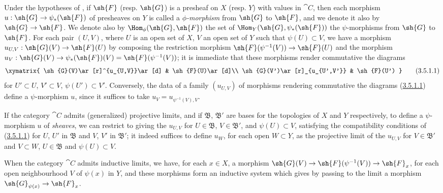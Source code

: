 \begin{env}[3.5.1]
\label{0.3.5.1}
Under the hypotheses of , if $\sh{F}$ (resp. $\sh{G}$) is a
presheaf on $X$ (resp. $Y$) with values in $\cat{C}$, then each morphism
$u:\sh{G}\to\psi_*(\sh{F})$ of presheaves on $Y$ is called a
\emph{$\phi$-morphism} from $\sh{G}$ to $\sh{F}$, and we denote it also by
$\sh{G}\to\sh{F}$. We denote also by $\Hom_\phi(\sh{G},\sh{F})$ the set of
$\Hom_Y(\sh{G},\psi_*(\sh{F}))$ the $\psi$-morphisms from $\sh{G}$ to $\sh{F}$.
For each pair $(U,V)$, where $U$ is an open set of $X$, $V$ an open set of $Y$
such that $\psi(U)\subset V$, we have a morphism $u_{U,V}:\sh{G}(V)\to\sh{F}(U)$
by composing the restriction morphism $\sh{F}(\psi^{-1}(V))\to\sh{F}(U)$ and the
morphism $u_V:\sh{G}(V)\to\psi_*(\sh{F})(V)=\sh{F}(\psi^{-1}(V))$; it is
immediate that these morphisms render commutative the diagrams
\[
\label{0.3.5.1.1}
  \xymatrix{
    \sh{G}(V)\ar[r]^{u_{U,V}}\ar[d] &
    \sh{F}(U)\ar[d]\\
    \sh{G}(V')\ar[r]_{u_{U',V'}} &
    \sh{F}(U')
  }
  \tag{3.5.1.1}
\]
for $U'\subset U$, $V'\subset V$, $\psi(U')\subset V'$. Conversely, the data of
a family $(u_{U,V})$ of morphisms rendering commutative the diagrams (\hyperref[0.3.5.1.1]{3.5.1.1})
define a $\psi$-morphism $u$, since it suffices to take
$u_V=u_{\psi^{-1}(V),V}$.

If the category $\cat{C}$ admits (generalized) projective limits, and if
$\mathfrak{B}$, $\mathfrak{B}'$ are bases for the topologies of $X$ and $Y$
respectively, to define a $\psi$-morphism $u$ of \emph{sheaves}, we can restrict
to giving the $u_{U,V}$ for $U\in\mathfrak{B}$, $V\in\mathfrak{B}'$, and
$\psi(U)\subset V$, satisfying the compatibility conditions of (\hyperref[0.3.5.1.1]{3.5.1.1}) for
$U$, $U'$ in $\mathfrak{B}$ and $V$, $V'$ in $\mathfrak{B}'$; it indeed suffices
to define $u_W$, for each open $W\subset Y$, as the projective limit of the
$u_{U,V}$ for $V\in\mathfrak{B}'$ and $V\subset W$, $U\in\mathfrak{B}$ and
$\psi(U)\subset V$.

When the category $\cat{C}$ admits inductive limits, we have, for each $x\in X$, a
morphism $\sh{G}(V)\to\sh{F}(\psi^{-1}(V))\to\sh{F}_x$, for each open
neighbourhood $V$ of $\psi(x)$ in $Y$, and these morphisms form an inductive
system which gives by passing to the limit a morphism
$\sh{G}_{\psi(x)}\to\sh{F}_x$.
\end{env}

